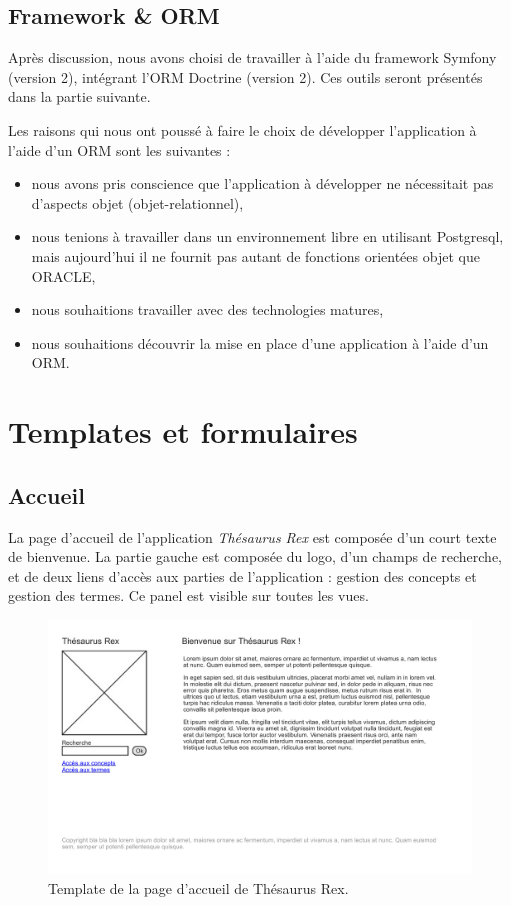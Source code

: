 \subsection{Framework \& ORM}

Après discussion, nous avons choisi de travailler à l'aide du framework Symfony (version 2), intégrant l'ORM Doctrine (version 2). Ces outils seront présentés dans la partie suivante.

Les raisons qui nous ont poussé à faire le choix de développer l'application à l'aide d'un ORM sont les suivantes :
\begin{itemize}
\item nous avons pris conscience que l'application à développer ne nécessitait pas d'aspects objet (objet-relationnel),
\item nous tenions à travailler dans un environnement libre en utilisant Postgresql, mais aujourd'hui il ne fournit pas autant de fonctions orientées objet que ORACLE,
\item nous souhaitions travailler avec des technologies matures,
\item nous souhaitions découvrir la mise en place d'une application à l'aide d'un ORM.
\end{itemize}
	
	
\section{Templates et formulaires}

\subsection{Accueil}

La page d'accueil de l'application \emph{Thésaurus Rex} est composée d'un court texte de bienvenue. La partie gauche est composée du logo, d'un champs de recherche, et de deux liens d'accès aux parties de l'application : gestion des concepts et gestion des termes. Ce panel est visible sur toutes les vues.
\begin{figure}[H]
\begin{center}
\includegraphics[width=\textwidth]{files/template_accueil}
\end{center}
\caption{Template de la page d'accueil de Thésaurus Rex.}
\end{figure}

